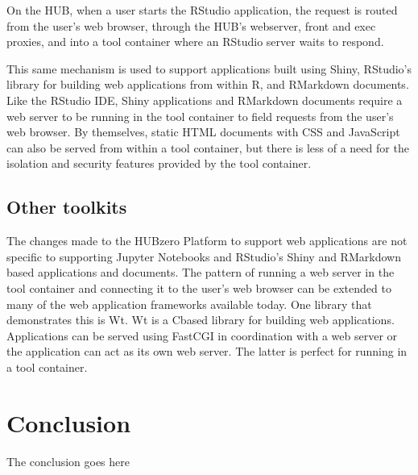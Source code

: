 \documentclass[conference]{../sty/IEEEtran}
\newcommand\CC{C\nolinebreak[4]\hspace{-.05em}\raisebox{.4ex}{\relsize{-3}{\textbf{++}}}\hspace{.25em}}
\begin{document}
On the HUB, when a user starts the RStudio application, the request is routed
from the user's web browser, through the HUB's webserver, front and exec
proxies, and into a tool container where an RStudio server waits to respond.

This same mechanism is used to support applications built using Shiny,
RStudio's library for building web applications from within R, and RMarkdown
documents. Like the RStudio IDE, Shiny applications and RMarkdown documents
require a web server to be running in the tool container to field requests from
the user's web browser. By themselves, static HTML documents with CSS and JavaScript
can also be served from within a tool container, but there is less of a need
for the isolation and security features provided by the tool container.



\subsection {Other toolkits}

The changes made to the HUBzero Platform to support web applications are not
specific to supporting Jupyter Notebooks and RStudio's Shiny and RMarkdown
based applications and documents. The pattern of running a web server in the
tool container and connecting it to the user's web browser can be extended to
many of the web application frameworks available today. One library that
demonstrates this is Wt\cite{wt}. Wt is a \CC based library for building web
applications. Applications can be served using FastCGI in coordination with a
web server or the application can act as its own web server. The latter is
perfect for running in a tool container.




\section{Conclusion}
The conclusion goes here



\end{document}
